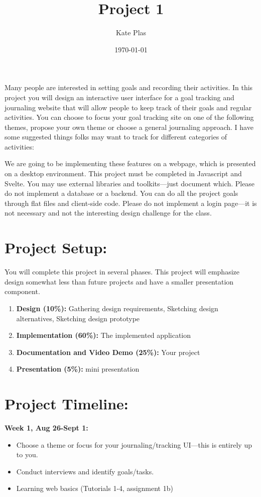 \documentclass{article}
\title{Project 1}
\author{Kate Plas}
\date{\today}
\begin{document}
\maketitle

Many people are interested in setting goals and recording their activities. In this project you will design an interactive user interface for a goal tracking and journaling website that will allow people to keep track of their goals and regular activities. You can choose to focus your goal tracking site on one of the following themes, propose your own theme or choose a general journaling approach. I have some suggested things folks may want to track for different categories of activities:

We are going to be implementing these features on a webpage, which is presented on a desktop environment. This project must be completed in Javascript and Svelte. You may use external libraries and toolkits—just document which. Please do not implement a database or a backend. You can do all the project goals through flat files and client-side code. Please do not implement a login page—it is not necessary and not the interesting design challenge for the class.

\section*{Project Setup:}
You will complete this project in several phases. This project will emphasize design somewhat less than future projects and have a smaller presentation component.

\begin{enumerate}[label=\arabic*.]
    \item \textbf{Design (10\%):} Gathering design requirements, Sketching design alternatives, Sketching design prototype
    \item \textbf{Implementation (60\%):} The implemented application
    \item \textbf{Documentation and Video Demo (25\%):} Your project
    \item \textbf{Presentation (5\%):} mini presentation
\end{enumerate}

\section*{Project Timeline:}
\textbf{Week 1, Aug 26-Sept 1:}
\begin{itemize}
    \item Choose a theme or focus for your journaling/tracking UI—this is entirely up to you.
    \item Conduct interviews and identify goals/tasks.
    \item Learning web basics (Tutorials 1-4, assignment 1b)
\end{itemize}
\end{document}
